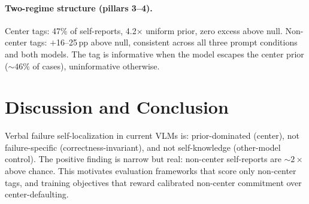 \documentclass[11pt]{article}
\begin{document}
\paragraph{Two-regime structure (pillars 3--4).}
Center tags: 47\% of self-reports, 4.2$\times$ uniform prior, zero excess above null.
Non-center tags: $+$16--25\,pp above null, consistent across all three prompt
conditions and both models.
The tag is informative when the model escapes the center prior (${\sim}46\%$ of
cases), uninformative otherwise.

\section{Discussion and Conclusion}

Verbal failure self-localization in current VLMs is: prior-dominated (center),
not failure-specific (correctness-invariant), and not self-knowledge
(other-model control).
The positive finding is narrow but real: non-center self-reports are ${\sim}2\times$
above chance.
This motivates evaluation frameworks that score only non-center tags, and training
objectives that reward calibrated non-center commitment over center-defaulting.



\end{document}
